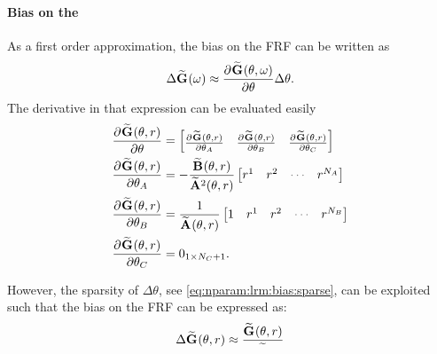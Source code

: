 \paragraph{Bias on the }
As a first order approximation, the bias on the \gls{FRF} can be written as
\begin{equation}
  \Delta \mathbf{\widetilde{G}}_{} (\omega) 
     \approx 
        \frac{{\partial}^{} \mathbf{\widetilde{G}}_{} (\theta, \omega)}{\partial \theta} 
      \Delta \theta
      \text{.}
\end{equation}
The derivative in that expression can be evaluated easily
\begin{align}
    \PartialDerivative{\LocalModel{G}(\theta, r)}{\theta} 
     &=
     \begin{bmatrix}
       \PartialDerivative{\LocalModel{G}(\theta,r)}{\theta_A} &
       \PartialDerivative{\LocalModel{G}(\theta,r)}{\theta_B} &
       \PartialDerivative{\LocalModel{G}(\theta,r)}{\theta_C} 
     \end{bmatrix}
     \\
     \PartialDerivative{\LocalModel{G}(\theta, r)}{\theta_A} 
     &=
     - \frac{\LocalModel{B}(\theta, r)}{\LocalModel{A}^2(\theta, r)}
     \begin{bmatrix}
         r^1 & r^2 & \deemph{\cdots} & r^{\order{A}}
     \end{bmatrix}
     \\
     \PartialDerivative{\LocalModel{G}(\theta, r)}{\theta_B} 
     &=
     \frac{1}{\LocalModel{A}(\theta, r)}
     \begin{bmatrix}
         1 & r^1 & r^2 & \deemph{\cdots} & r^{\order{B}}
     \end{bmatrix}
     \\
     \PartialDerivative{\LocalModel{G}(\theta, r)}{\theta_C} 
     &=
     \Zero{1 \times \order{C}+1}
     \text{.}
\end{align}

However, the sparsity of $\Delta\theta$, see \eqref{eq:nparam:lrm:bias:sparse}, can be exploited such that the bias on the \gls{FRF} can be expressed as:
\begin{equation}
  \Delta \mathbf{\widetilde{G}}_{} (\theta,r)
  \approx
  \frac{\mathbf{\widetilde{G}}_{} (\theta, r)}{\mathbf{\widetilde{}}_{} }
\end{equation}


